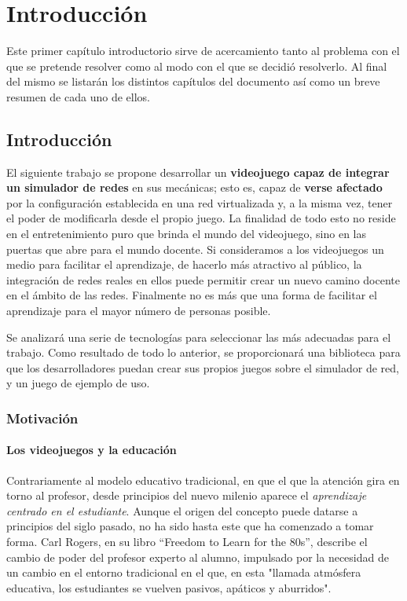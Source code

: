 \chapter{Introducción}\label{chap:Intro}
Este primer capítulo introductorio sirve de acercamiento tanto al problema con el que se pretende resolver como al modo con el que se decidió resolverlo. Al final del mismo se listarán los distintos capítulos del documento así como un breve resumen de cada uno de ellos.

\section{Introducción}
El siguiente trabajo se propone desarrollar un \textbf{videojuego capaz de integrar un simulador de redes} en sus mecánicas; esto es, capaz de \textbf{verse afectado} por la configuración establecida en una red virtualizada y, a la misma vez, tener el poder de modificarla desde el propio juego. La finalidad de todo esto no reside en el entretenimiento puro que brinda el mundo del videojuego, sino en las puertas que abre para el mundo docente. Si consideramos a los videojuegos un medio para facilitar el aprendizaje, de hacerlo más atractivo al público, la integración de redes reales en ellos puede permitir crear un nuevo camino docente en el ámbito de las redes. Finalmente no es más que una forma de facilitar el aprendizaje para el mayor número de personas posible.

Se analizará una serie de tecnologías para seleccionar las más adecuadas para el trabajo. Como resultado de todo lo anterior, se proporcionará una biblioteca para que los desarrolladores puedan crear sus propios juegos sobre el simulador de red, y un juego de ejemplo de uso.

\subsection{Motivación}
\subsubsection{Los videojuegos y la educación}
Contrariamente al modelo educativo tradicional, en que el que la atención gira en torno al profesor, desde principios del nuevo milenio aparece el \textit{aprendizaje centrado en el estudiante}. Aunque el origen del concepto puede datarse a principios del siglo pasado, no ha sido hasta este que ha comenzado a tomar forma. Carl Rogers, en su libro ``Freedom to Learn for the 80s'', describe el cambio de poder del profesor experto al alumno, impulsado por la necesidad de un cambio en el entorno tradicional en el que, en esta "llamada atmósfera educativa, los estudiantes se vuelven pasivos, apáticos y aburridos"\cite{studentcentered}.

